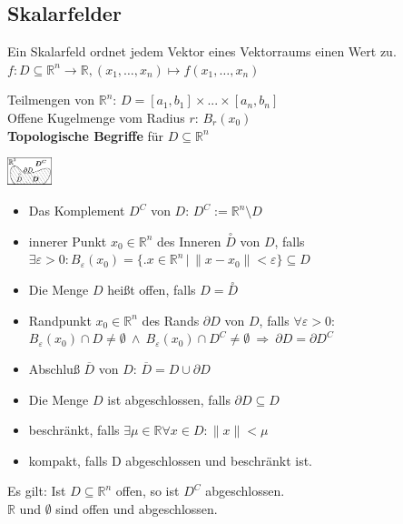 \documentclass[6pt,a4paper]{scrartcl}
\newcommand{\iset}[2]{\ensuremath{\bigl\{ \bigl. #1 \, \bigr| \, #2 \bigr\}}}					%
\newcommand{\norm}[1]{\ensuremath{\|#1\|}}														%
\renewcommand{\emph}[1]{\textbf{#1}}															%
\newcommand{\ol}[1]{\ensuremath{\overline{#1}}}									%
\newcommand{\R}{\ensuremath{\mathbb R}}
\begin{document}
\begin{multicols*}{4}
\section{Skalarfelder}
Ein Skalarfeld ordnet jedem Vektor eines Vektorraums einen Wert zu.\\
$ f:D\subseteq \mathbb R^n \rightarrow \mathbb R, (x_1,\ldots ,x_n) \mapsto f(x_1,\ldots ,x_n) $
\parbox{5.5cm}{
Teilmengen von $\mathbb R^n$: $D = [a_1,b_1] \times ... \times [a_n,b_n]$\\
Offene Kugelmenge vom Radius $r$: $B_r(x_0)$\\
\emph{Topologische Begriffe} für $D \subseteq \mathbb R^n$ } \parbox{1.0cm}{ \includegraphics[height=0.8cm]{img/topologie.pdf} }
\begin{itemize}\itemsep-1pt
	\item Das Komplement $D^C$ von $D$: $D^C := \R^n \setminus D$
	\item innerer Punkt $x_0 \in \mathbb R^n$ des Inneren $\overset{\circ}{D}$ von $D$, falls \\
		$\exists \varepsilon > 0: B_\varepsilon (x_0) = \iset{x\in \mathbb R^n}{\norm{x-x_0} < \varepsilon} \subseteq D$
	\item Die Menge $D$ heißt offen, falls $D=\overset{\circ}{D}$
	\item Randpunkt $x_0 \in \mathbb R^n$ des Rands $\partial D$ von $D$, falls $\forall \varepsilon > 0:$ \\ 
		$B_\varepsilon(x_0) \cap D \ne \emptyset \ \land \ B_\varepsilon(x_0) \cap D^C \ne \emptyset \ \Rightarrow \ \partial D = \partial D^C$
	\item Abschluß $\ol D$ von $D$: $\overline{D}=D \cup \partial D$
	\item Die Menge $D$ ist abgeschlossen, falls $\partial D \subseteq D$
	\item beschränkt, falls $\exists \mu \in \mathbb R \forall x \in D: \norm{x} < \mu$
	\item kompakt, falls D abgeschlossen und beschränkt ist. 
\end{itemize}
Es gilt: Ist $D \subseteq \mathbb R^n$ offen, so ist $D^C$ abgeschlossen. \\
$\mathbb R$ und $\emptyset$ sind offen und abgeschlossen.





\end{multicols*}
\end{document}
